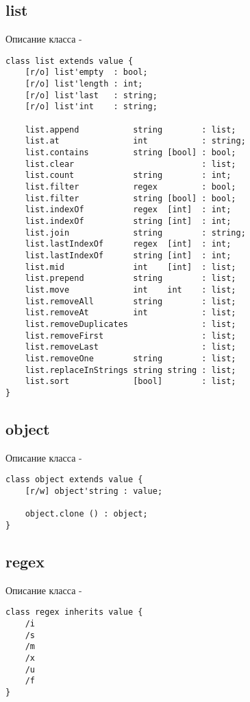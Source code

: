 \subsection{{\color{lightblue} list}}

\noindent Описание класса \listtype -
\begin{lstlisting}[numbers=none]
class list extends value {
    [r/o] list'empty  : bool;
    [r/o] list'length : int;
    [r/o] list'last   : string;
    [r/o] list'int    : string;

    list.append           string        : list;
    list.at               int           : string;
    list.contains         string [bool] : bool;
    list.clear                          : list;
    list.count            string        : int;
    list.filter           regex         : bool;
    list.filter           string [bool] : bool;
    list.indexOf          regex  [int]  : int;
    list.indexOf          string [int]  : int;
    list.join             string        : string;
    list.lastIndexOf      regex  [int]  : int;
    list.lastIndexOf      string [int]  : int;
    list.mid              int    [int]  : list;
    list.prepend          string        : list;
    list.move             int    int    : list;
    list.removeAll        string        : list;
    list.removeAt         int           : list;
    list.removeDuplicates               : list;
    list.removeFirst                    : list;
    list.removeLast                     : list;
    list.removeOne        string        : list;
    list.replaceInStrings string string : list;
    list.sort             [bool]        : list;
}
\end{lstlisting}

\subsection{{\color{lightblue} object}}

\noindent Описание класса \object -
\begin{lstlisting}[numbers=none]
class object extends value {
    [r/w] object'string : value;
    
    object.clone () : object;
}
\end{lstlisting}

\subsection{{\color{lightblue} regex}}

\noindent Описание класса \regex -
\begin{lstlisting}[numbers=none]
class regex inherits value {
    /i
    /s
    /m
    /x
    /u
    /f
}
\end{lstlisting}

